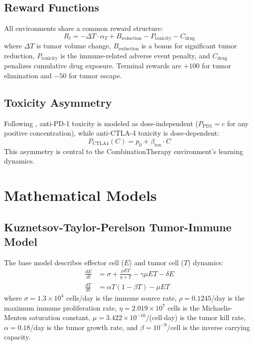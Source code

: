 \documentclass[11pt,a4paper]{article}
\begin{document}
\subsection{Reward Functions}

All environments share a common reward structure:
\begin{equation}
    R_t = -\Delta T \cdot \alpha_T + B_{\text{reduction}} - P_{\text{toxicity}} - C_{\text{drug}}
\end{equation}
where $\Delta T$ is tumor volume change, $B_{\text{reduction}}$ is a bonus for significant tumor reduction, $P_{\text{toxicity}}$ is the immune-related adverse event penalty, and $C_{\text{drug}}$ penalizes cumulative drug exposure. Terminal rewards are $+100$ for tumor elimination and $-50$ for tumor escape.

\subsection{Toxicity Asymmetry}

Following \citet{Shulgin2020}, anti-PD-1 toxicity is modeled as dose-independent ($P_{\text{PD1}} = c$ for any positive concentration), while anti-CTLA-4 toxicity is dose-dependent:
\begin{equation}
    P_{\text{CTLA4}}(C) = p_0 + \beta_{\text{tox}} \cdot C
\end{equation}
This asymmetry is central to the CombinationTherapy environment's learning dynamics.

\section{Mathematical Models}

\subsection{Kuznetsov-Taylor-Perelson Tumor-Immune Model}

The base model \citep[Kuznetsov, Taylor, Makalkin, and Perelson]{Kuznetsov1994} describes effector cell ($E$) and tumor cell ($T$) dynamics:
\begin{align}
    \frac{dE}{dt} &= \sigma + \frac{\rho E T}{\eta + T} - \gamma \mu E T - \delta E \label{eq:kt_E} \\
    \frac{dT}{dt} &= \alpha T (1 - \beta T) - \mu E T \label{eq:kt_T}
\end{align}
where $\sigma = 1.3 \times 10^4$ cells/day is the immune source rate, $\rho = 0.1245$/day is the maximum immune proliferation rate, $\eta = 2.019 \times 10^7$ cells is the Michaelis-Menten saturation constant, $\mu = 3.422 \times 10^{-10}$/(cell$\cdot$day) is the tumor kill rate, $\alpha = 0.18$/day is the tumor growth rate, and $\beta = 10^{-9}$/cell is the inverse carrying capacity.
\end{document}
